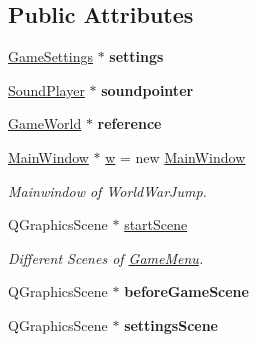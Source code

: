 \subsection*{Public Attributes}
\begin{DoxyCompactItemize}
\item 
\hyperlink{class_game_settings}{Game\+Settings} $\ast$ {\bfseries settings}\hypertarget{class_game_menu_a0047e42e8cef38e9faa5ba67d6dea508}{}\label{class_game_menu_a0047e42e8cef38e9faa5ba67d6dea508}

\item 
\hyperlink{class_sound_player}{Sound\+Player} $\ast$ {\bfseries soundpointer}\hypertarget{class_game_menu_a9dfd20cecbc58d41918f85f08942065d}{}\label{class_game_menu_a9dfd20cecbc58d41918f85f08942065d}

\item 
\hyperlink{class_game_world}{Game\+World} $\ast$ {\bfseries reference}\hypertarget{class_game_menu_acd0a5b94ff397f9247088d5942c27341}{}\label{class_game_menu_acd0a5b94ff397f9247088d5942c27341}

\item 
\hyperlink{class_main_window}{Main\+Window} $\ast$ \hyperlink{class_game_menu_ab2cbc2fb13a1e67c958efe22a58c5ec2}{w} = new \hyperlink{class_main_window}{Main\+Window}\hypertarget{class_game_menu_ab2cbc2fb13a1e67c958efe22a58c5ec2}{}\label{class_game_menu_ab2cbc2fb13a1e67c958efe22a58c5ec2}

\begin{DoxyCompactList}\small\item\em Mainwindow of World\+War\+Jump. \end{DoxyCompactList}\item 
Q\+Graphics\+Scene $\ast$ \hyperlink{class_game_menu_ab72c5ce17a0f06580b74c495cb9694ce}{start\+Scene}\hypertarget{class_game_menu_ab72c5ce17a0f06580b74c495cb9694ce}{}\label{class_game_menu_ab72c5ce17a0f06580b74c495cb9694ce}

\begin{DoxyCompactList}\small\item\em Different Scenes of \hyperlink{class_game_menu}{Game\+Menu}. \end{DoxyCompactList}\item 
Q\+Graphics\+Scene $\ast$ {\bfseries before\+Game\+Scene}\hypertarget{class_game_menu_a96efe4b74ad120a5920e141cec544f94}{}\label{class_game_menu_a96efe4b74ad120a5920e141cec544f94}

\item 
Q\+Graphics\+Scene $\ast$ {\bfseries settings\+Scene}\hypertarget{class_game_menu_a034da5f5a381412e92d1764f5af32883}{}\label{class_game_menu_a034da5f5a381412e92d1764f5af32883}


\end{DoxyCompactItemize}
